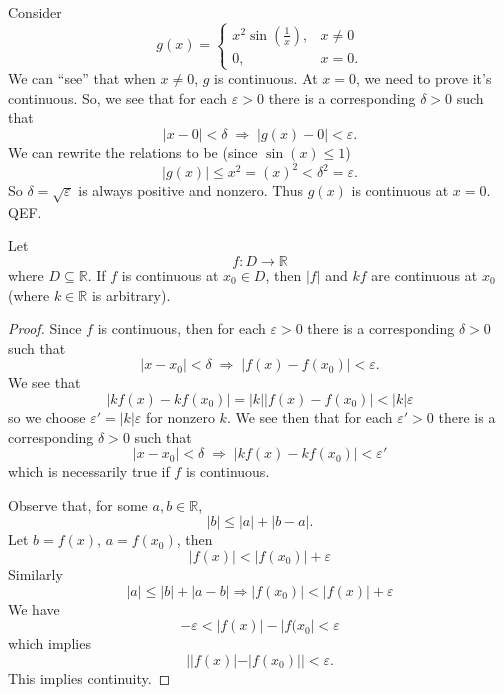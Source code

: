 \begin{ex}
Consider 
\begin{equation}
g(x) = \begin{cases} x^{2}\sin\left(\frac{1}{x}\right), & x\neq0\\
0, & x=0.\end{cases}
\end{equation}
We can ``see'' that when $x\neq0$, $g$ is continuous. At $x=0$,
we need to prove it's continuous. So, we see that for each
$\varepsilon>0$ there is a corresponding $\delta>0$ such that
\begin{equation}
|x-0|<\delta\;\Rightarrow\;|g(x)-0|<\varepsilon.
\end{equation}
We can rewrite the relations to be (since $\sin(x)\leq1$)
\begin{equation}
|g(x)|\leq x^2 = (x)^2 < \delta^2 = \varepsilon.
\end{equation}
So $\delta=\sqrt{\varepsilon}$ is always positive and
nonzero. Thus $g(x)$ is continuous at $x=0$. QEF.
\end{ex}
\begin{thm}
Let 
\begin{equation}
f:D\to\mathbb{R}
\end{equation}
where $D\subseteq\mathbb{R}$. If $f$ is continuous at $x_{0}\in
D$, then $|f|$ and $kf$ are continuous at $x_{0}$ (where
$k\in\mathbb{R}$ is arbitrary).
\end{thm}
\begin{proof}
Since $f$ is continuous, then for each $\varepsilon>0$ there is a
corresponding $\delta>0$ such that
\begin{equation}
|x-x_{0}|<\delta\;\Rightarrow\;|f(x)-f(x_{0})|<\varepsilon.
\end{equation}
We see that
\begin{equation}
|kf(x)-kf(x_{0})|=|k||f(x)-f(x_{0})|<|k|\varepsilon
\end{equation}
so we choose $\varepsilon'=|k|\varepsilon$ for nonzero $k$. We
see then that for each $\varepsilon'>0$ there is a corresponding
$\delta>0$ such that
\begin{equation}
|x-x_{0}|<\delta\;\Rightarrow\;|kf(x)-kf(x_{0})|<\varepsilon'
\end{equation}
which is necessarily true if $f$ is continuous.

Observe that, for some $a,b\in\mathbb{R}$,
\begin{equation}
|b|\leq|a|+|b-a|.
\end{equation}
Let $b=f(x)$, $a=f(x_{0})$, then
\begin{equation}
|f(x)|<|f(x_{0})|+\varepsilon
\end{equation}
Similarly
\begin{equation}
|a|\leq|b|+|a-b|\Rightarrow|f(x_{0})|<|f(x)|+\varepsilon
\end{equation}
We have
\begin{equation}
-\varepsilon<|f(x)|-|f(x_{0}|<\varepsilon
\end{equation}
which implies
\begin{equation}
||f(x)|-|f(x_{0})||<\varepsilon.
\end{equation}
This implies continuity.
\end{proof}
